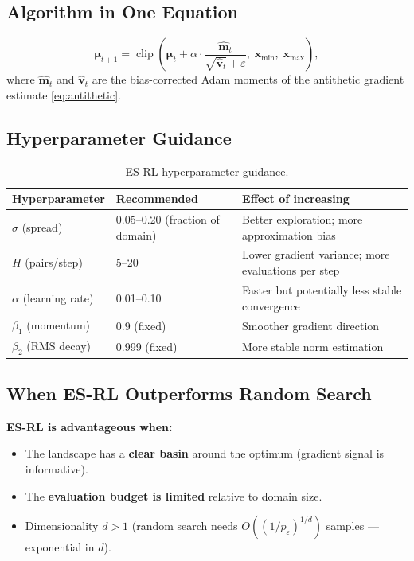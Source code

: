 \documentclass[12pt, a4paper]{article}
\newcommand{\bmu}{\boldsymbol{\mu}}
\newcommand{\bx}{\mathbf{x}}
\newcommand{\mhat}{\hat{\mathbf{m}}}     %
\newcommand{\vhat}{\hat{\mathbf{v}}}     %
\DeclareMathOperator{\clip}{clip}
\begin{document}
\subsection{Algorithm in One Equation}

\begin{importantbox}
  \begin{equation}
    \bmu_{t+1}
    = \clip\!\left(
        \bmu_t
        + \alpha\cdot
          \frac{\mhat_t}{\sqrt{\vhat_t}+\varepsilon},\;
        \bx_{\min},\;\bx_{\max}
      \right),
    \label{eq:full_update}
  \end{equation}
  where $\mhat_t$ and $\vhat_t$ are the bias-corrected Adam moments of
  the antithetic gradient estimate \eqref{eq:antithetic}.
\end{importantbox}

\subsection{Hyperparameter Guidance}

\begin{table}[ht]
  \centering
  \caption{ES-RL hyperparameter guidance.}
  \label{tab:hyp}
  \begin{tabular}{@{}p{3.5cm}p{3cm}p{7cm}@{}}
    \toprule
    \textbf{Hyperparameter} & \textbf{Recommended} & \textbf{Effect of increasing} \\
    \midrule
    $\sigma$ (spread) & 0.05--0.20 (fraction of domain) &
      Better exploration; more approximation bias \\[3pt]
    $H$ (pairs/step)  & 5--20 &
      Lower gradient variance; more evaluations per step \\[3pt]
    $\alpha$ (learning rate) & 0.01--0.10 &
      Faster but potentially less stable convergence \\[3pt]
    $\beta_1$ (momentum) & 0.9 (fixed) &
      Smoother gradient direction \\[3pt]
    $\beta_2$ (RMS decay) & 0.999 (fixed) &
      More stable norm estimation \\
    \bottomrule
  \end{tabular}
\end{table}

\subsection{When ES-RL Outperforms Random Search}

\textbf{ES-RL is advantageous when:}
\begin{itemize}
  \item The landscape has a \textbf{clear basin} around the optimum
        (gradient signal is informative).
  \item The \textbf{evaluation budget is limited} relative to domain size.
  \item Dimensionality $d>1$ (random search needs
        $O((1/p_\varepsilon)^{1/d})$ samples --- exponential in $d$).
\end{itemize}
\end{document}
